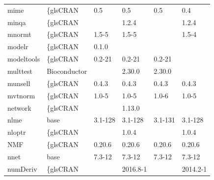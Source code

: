 \begin{longtable}{llllll}
mime                          & \{gls{CRAN}                      & 0.5         & 0.5         & 0.5            & 0.4               \\
\rowcolor{black!5}
minqa                         & \{gls{CRAN}                      &             & 1.2.4       &                & 1.2.4              \\
\rowcolor{black!10}
mnormt                        & \{gls{CRAN}                      & 1.5-5       & 1.5-5       &                & 1.5-4             \\
\rowcolor{black!5}
modelr                        & \{gls{CRAN}                      & 0.1.0       &             &                &                    \\
\rowcolor{black!10}
modeltools                    & \{gls{CRAN}                      & 0.2-21      & 0.2-21      & 0.2-21         &                   \\
\rowcolor{black!5}
multtest                      & Bioconductor              &             & 2.30.0      & 2.30.0         &                    \\
\rowcolor{black!10}
munsell                       & \{gls{CRAN}                      & 0.4.3       & 0.4.3       & 0.4.3          & 0.4.3             \\
\rowcolor{black!5}
mvtnorm                       & \{gls{CRAN}                      & 1.0-5       & 1.0-5       & 1.0-6          & 1.0-5              \\
\rowcolor{black!10}
network                       & \{gls{CRAN}                      &             & 1.13.0      &                &                   \\
\rowcolor{black!5}
nlme                          & base                      & 3.1-128     & 3.1-128     & 3.1-131        & 3.1-128            \\
\rowcolor{black!10}
nloptr                        & \{gls{CRAN}                      &             & 1.0.4       &                & 1.0.4             \\
\rowcolor{black!5}
NMF                           & \{gls{CRAN}                      & 0.20.6      & 0.20.6      & 0.20.6         & 0.20.6             \\
\rowcolor{black!10}
nnet                          & base                      & 7.3-12      & 7.3-12      & 7.3-12         & 7.3-12            \\
\rowcolor{black!5}
numDeriv                      & \{gls{CRAN}                      &             & 2016.8-1    &                & 2014.2-1           \\

\end{longtable}

